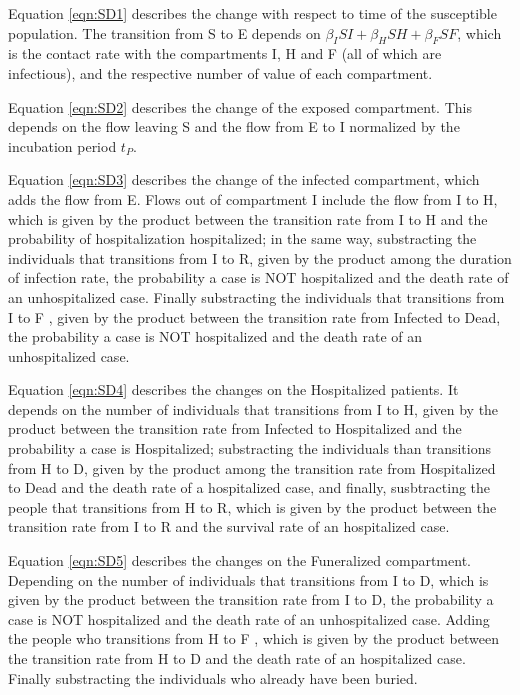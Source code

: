 

%


Equation \ref{eqn:SD1} describes the change with respect to time of the susceptible population. The transition from S to E depends on $\beta_{I}SI+\beta_{H}SH+\beta_{F}SF$, which is the contact rate with the compartments I, H and F (all of which are infectious), and the respective number of value of each compartment.

Equation \ref{eqn:SD2} describes the change of the exposed compartment. This depends on the flow leaving S and the flow from E to I normalized by the incubation period $t_P$.

Equation \ref{eqn:SD3} describes the change of the infected compartment, which adds the flow from E. Flows out of compartment I include the flow from I to H, which is given by the product between the transition rate from I to H and the probability of hospitalization hospitalized; in the same way, substracting the individuals that transitions from I to R, given by  the product among the duration of infection rate, the probability a case is NOT hospitalized and the death rate of an unhospitalized case. Finally substracting the individuals that transitions from I to F , given by the product between the transition rate from Infected to Dead,  the probability a case is NOT hospitalized and the death rate of an unhospitalized case.

Equation \ref{eqn:SD4} describes the changes on the Hospitalized patients. It depends on the number of individuals that transitions from I to H, given by the  product between the transition rate from Infected to Hospitalized and the probability a case is Hospitalized;  substracting the individuals than transitions from H to D, given by the product among the transition rate from Hospitalized to Dead and the death rate of a hospitalized case, and finally, susbtracting the people that transitions from H to R, which is given by the product between the transition rate from I to R and the survival rate of an hospitalized case.

Equation \ref{eqn:SD5} describes the changes on the Funeralized compartment.  Depending on the number of individuals that transitions from I to D, which is given by the product between the transition rate from I to D, the probability a case is NOT hospitalized and the death rate of an unhospitalized case. Adding the people who transitions from H to F , which is given by the product between the transition rate from H to D and the death rate of an hospitalized case. Finally substracting the individuals who already have been buried.

